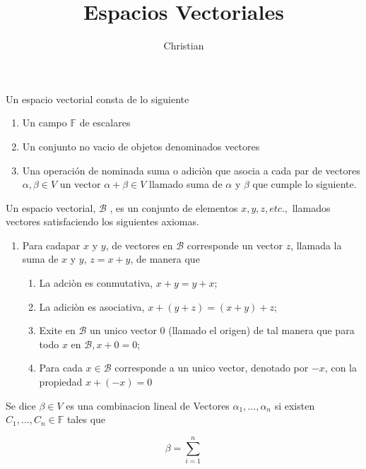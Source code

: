 

\title{Espacios Vectoriales}
\author{Christian}


		\maketitle
		\tableofcontents
    	

\begin{definicion}
		
			Un espacio vectorial consta de lo siguiente 
			\end{definicion}
		\begin{enumerate}
				\item Un campo $\mathbb{F}$ de escalares
				\item Un conjunto no vacio de objetos denominados vectores 
				\item Una operaci\'on de nominada suma o adici\`on que asocia a cada par de vectores $\alpha , \beta \in V $ un vector $\alpha + \beta \in V $ llamado suma de $\alpha$ y $\beta$ que cumple lo siguiente.
		\end{enumerate}
		

	\begin{definicion}
		 Un espacio vectorial, $\mathcal{B}$ , es un conjunto de elementos $x,y,z,etc.,$ llamados vectores satisfaciendo  los siguientes axiomas.
	\end{definicion}
	 \begin{enumerate}[a]
	 	\item  Para cadapar $x$ y $y$, de vectores en $\mathcal{B}$ corresponde un vector $z$, llamada la suma de $x$ y $y$, $z=x+y$, de manera que \begin{enumerate}
	 		\item La adci\`on es conmutativa, $x+y=y+x$;
	 		\item La adici\`on es asociativa, $x+(y+z)=(x+y)+z$;
	 		\item Exite en $\mathcal{B}$ un unico vector 0 (llamado el origen) de tal manera que para todo $x$ en $\mathcal{B},x+0=0$;
	 		\item Para cada $x\in \mathcal{B}$ corresponde a un unico vector, denotado por $-x$, con  la propiedad $x+(-x)=0$ 
	 	\end{enumerate}  
	 \end{enumerate}

		\begin{definicion}
	Se dice $\beta \in V $ es una combinacion lineal de Vectores $\alpha_1 , \dots ,\alpha_n $ si existen $C_1 , \dots , C_n \in \mathbb{F}$ tales que
	 \end{definicion}
	   \begin{equation}
	   			\beta = \sum \limits_{i=1}^n \nonumber
	   \end{equation}

